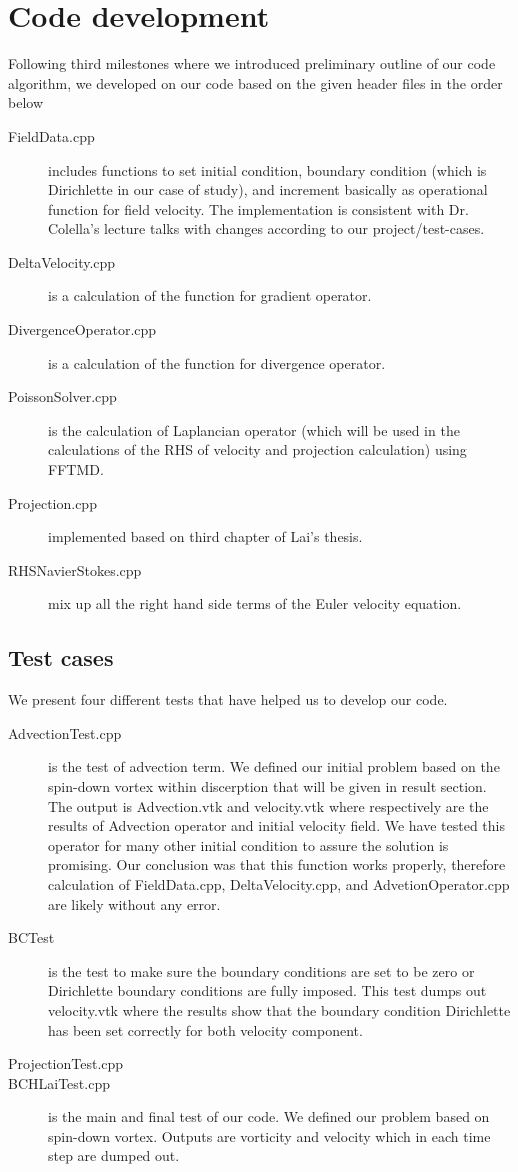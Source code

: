 \documentclass{article}
\begin{document}
\section{Code development}

Following third milestones where we introduced preliminary outline of our code algorithm, we developed on our code based on the given header files in the order below
\begin{description}
	\item[FieldData.cpp] includes functions to set initial condition, boundary condition (which is Dirichlette in our case of study), and increment basically as operational function for field velocity. The implementation is consistent with Dr. Colella's lecture talks with changes according to our project/test-cases.
	\item[DeltaVelocity.cpp] is a calculation of the function for gradient operator. 
	\item[DivergenceOperator.cpp] is a calculation of the function for divergence operator. 
	\item[PoissonSolver.cpp] is the calculation of Laplancian operator (which will be used in the calculations of the RHS of velocity and projection calculation) using FFTMD.
	\item [Projection.cpp] implemented based on third chapter of Lai's thesis.
	\item [RHSNavierStokes.cpp] mix up all the right hand side terms of the Euler velocity equation. 
\end{description}

\subsection{Test cases}
We present four different tests that have helped us to develop our code.
\begin{description}
	\item[AdvectionTest.cpp]  is the test of advection term. We defined our initial problem based on the spin-down vortex within discerption that will be given in result section. The output is Advection.vtk and velocity.vtk where respectively are the results of Advection operator and initial velocity field. We have tested this operator for many other initial condition to assure the solution is promising. Our conclusion was that this function works properly, therefore calculation of FieldData.cpp, DeltaVelocity.cpp, and AdvetionOperator.cpp are likely without any error.
	\item[BCTest] is the test to make sure the boundary conditions are set to be zero or Dirichlette boundary conditions are fully imposed. This test dumps out velocity.vtk where the results show that the boundary condition Dirichlette has been set correctly for both velocity component.
	\item[ProjectionTest.cpp] 
	\item[BCHLaiTest.cpp] is the main and final test of our code. We defined our problem based on \cite{howel1997} spin-down vortex. Outputs are vorticity and velocity which in each time step are dumped out. 
\end{description}
\end{document}
